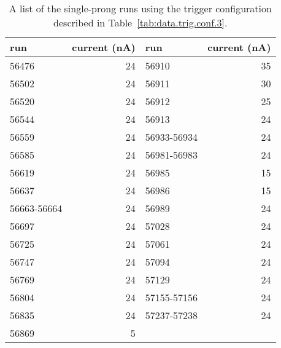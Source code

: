 \begin{table}
\begin{minipage}{\textwidth}
\begin{center}
\begin{singlespacing}

\caption[Single-prong Run List]{\label{tab:data.cook.singlesecruns}A list of the single-prong runs using the trigger configuration described in Table~\ref{tab:data.trig.conf.3}.\vspace{0.75mm}}

\begin{tabular}{lr|lr}

\hline
run & current (nA) & run & current (nA) \\
\hline

56476 & 24 & 56910 & 35 \\
56502 & 24 & 56911 & 30 \\
56520 & 24 & 56912 & 25 \\
56544 & 24 & 56913 & 24 \\
56559 & 24 & 56933-56934 & 24 \\
56585 & 24 & 56981-56983 & 24 \\
56619 & 24 & 56985 & 15 \\
56637 & 24 & 56986 & 15 \\
56663-56664 & 24 & 56989 & 24 \\
56697 & 24 & 57028 & 24 \\
56725 & 24 & 57061 & 24 \\
56747 & 24 & 57094 & 24 \\
56769 & 24 & 57129 & 24 \\
56804 & 24 & 57155-57156 & 24 \\
56835 & 24 & 57237-57238 & 24 \\
56869 & 5 \\

\hline \hline

\end{tabular}

\end{singlespacing}
\end{center}
\end{minipage}
\end{table}
\vspace{20pt}